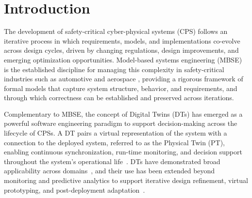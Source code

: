 \section{Introduction}


The development of safety-critical cyber-physical systems (CPS) follows an iterative process in which requirements, models, and implementations co-evolve across design cycles, driven by changing regulations, design improvements, and emerging optimization opportunities. Model-based systems engineering (MBSE)~\cite{INCOSE2023} is the established discipline for managing this complexity in safety-critical industries such as automotive and aerospace \cite{kugele2021automotive,broy2012spes,eurocae2011ed12c,rtca2011do178c}, providing a rigorous framework of formal models that capture system structure, behavior, and requirements, and through which correctness can be established and preserved across iterations.%



Complementary to MBSE, the concept of Digital Twins (DTs) \cite{grieves2005} has emerged as a powerful software engineering paradigm to support decision-making across the lifecycle of CPSs. A DT pairs a virtual representation of the system with a connection to the deployed system, referred to as the Physical Twin (PT), enabling continuous synchronization, run-time monitoring, and decision support throughout the system’s operational life~\cite{grieves2005,Tao2019, Minerva2020}. DTs have demonstrated broad applicability across domains~\cite{Woodcock2021, Liu2021}, and their use has been extended beyond monitoring and predictive analytics to support iterative design refinement, virtual prototyping, and post-deployment adaptation~\cite{Tao2018, Mertens2024, Lehner2025}.


